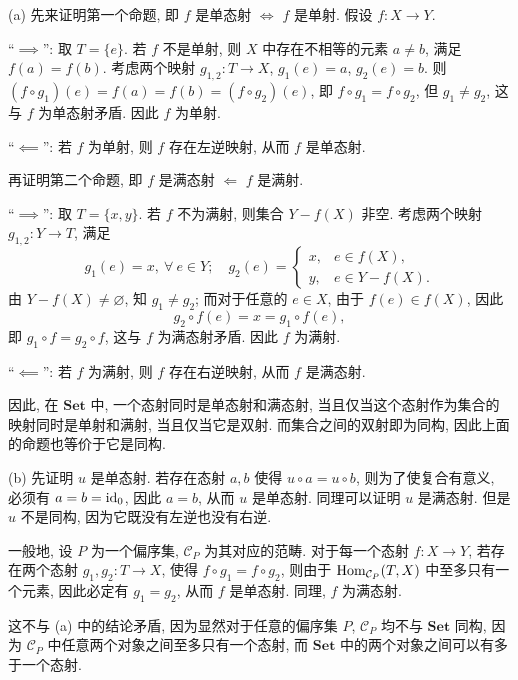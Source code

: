 \documentclass{article}
\begin{document}
\begin{solution}
	(a) 先来证明第一个命题, 即 $f$ 是单态射 $\Longleftrightarrow$ $f$ 是单射. 假设 $f:X\to Y$.

	``$\implies$'': 取 $T = \{e\}$. 若 $f$ 不是单射, 则 $X$ 中存在不相等的元素 $a\neq b$, 满足 $f(a)=f(b)$. 考虑两个映射 $g_{1,2}: T\to X$, $g_1(e) = a$, $g_2(e) = b$. 则 $(f \circ g_1)(e) = f(a) = f(b) = (f \circ g_2)(e)$, 即 $f \circ g_1 = f\circ g_2$, 但 $g_1 \neq g_2$, 这与 $f$ 为单态射矛盾. 因此 $f$ 为单射.

	``$\impliedby$'': 若 $f$ 为单射, 则 $f$ 存在左逆映射, 从而 $f$ 是单态射.

	再证明第二个命题, 即 $f$ 是满态射 $\Longleftarrow$ $f$ 是满射.

	``$\implies$'': 取 $T = \{x,y\}$. 若 $f$ 不为满射, 则集合 $Y-f(X)$ 非空. 考虑两个映射 $g_{1,2}: Y \to T$, 满足
	\[ g_1(e) = x,\ \forall\ e\in Y;\quad 
	g_2(e) = \begin{cases}
		x, & e \in f(X),\\
		y, & e \in Y-f(X).
	\end{cases} \]
	由 $Y-f(X) \neq \varnothing$, 知 $g_1 \neq g_2$; 而对于任意的 $e\in X$, 由于 $f(e)\in f(X)$, 因此
	\[ g_2\circ f(e) = x = g_1 \circ f(e), \]
	即 $g_1 \circ f = g_2 \circ f$, 这与 $f$ 为满态射矛盾. 因此 $f$ 为满射.

	``$\impliedby$'': 若 $f$ 为满射, 则 $f$ 存在右逆映射, 从而 $f$ 是满态射.

	因此, 在 $\mathbf{Set}$ 中, 一个态射同时是单态射和满态射, 当且仅当这个态射作为集合的映射同时是单射和满射, 当且仅当它是双射. 而集合之间的双射即为同构, 因此上面的命题也等价于它是同构.

	(b) 先证明 $u$ 是单态射. 若存在态射 $a,b$ 使得 $u \circ a = u \circ b$, 则为了使复合有意义, 必须有 $a=b= \operatorname{id}_0$, 因此 $a=b$, 从而 $u$ 是单态射. 同理可以证明 $u$ 是满态射. 但是 $u$ 不是同构, 因为它既没有左逆也没有右逆.

	一般地, 设 $P$ 为一个偏序集, $\mathcal{C}_P$ 为其对应的范畴. 对于每一个态射 $f: X\to Y$, 若存在两个态射 $g_1,g_2: T \to X$, 使得 $f \circ g_1 = f\circ g_2$, 则由于 $\operatorname{Hom}_{\mathcal{C}_P}(T,X)$ 中至多只有一个元素, 因此必定有 $g_1 = g_2$, 从而 $f$ 是单态射. 同理, $f$ 为满态射. 

	这不与 (a) 中的结论矛盾, 因为显然对于任意的偏序集 $P$, $\mathcal{C}_P$ 均不与 $\mathbf{Set}$ 同构, 因为 $\mathcal{C}_P$ 中任意两个对象之间至多只有一个态射, 而 $\mathbf{Set}$ 中的两个对象之间可以有多于一个态射.
\end{solution}
\end{document}
